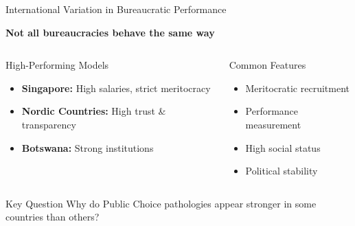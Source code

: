 \documentclass[10pt]{beamer}
\begin{document}
\begin{frame}{International Variation in Bureaucratic Performance}

\centering
\textbf{Not all bureaucracies behave the same way}
\vspace{0.3cm}

\begin{columns}[t]
\begin{exampleblock}{High-Performing Models}
\footnotesize
\begin{itemize}
\item \textbf{Singapore:} High salaries, strict meritocracy
\item \textbf{Nordic Countries:} High trust \& transparency
\item \textbf{Botswana:} Strong institutions
\end{itemize}
\end{exampleblock}

\begin{block}{Common Features}
\footnotesize
\begin{itemize}
\item Meritocratic recruitment
\item Performance measurement
\item High social status
\item Political stability
\end{itemize}
\end{block}

\end{columns}

\vspace{0.4cm}

\begin{alertblock}{Key Question}
Why do Public Choice pathologies appear stronger in some countries than others?
\end{alertblock}

\end{frame}
\end{document}
